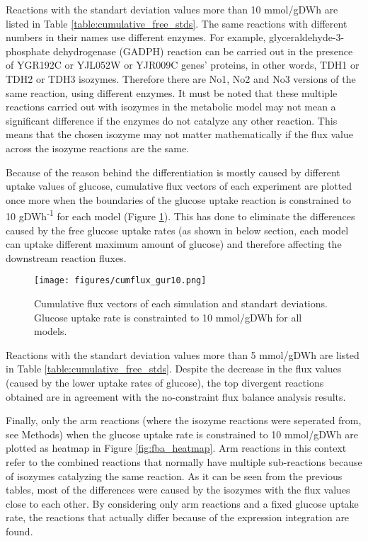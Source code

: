 Reactions with the standart deviation values more than 10 mmol/gDWh are listed in Table \ref{table:cumulative_free_stds}. The same reactions with different numbers in their names use different enzymes. For example, glyceraldehyde-3-phosphate dehydrogenase (GADPH) reaction can be carried out in the presence of YGR192C or YJL052W or YJR009C genes' proteins, in other words, TDH1 or TDH2 or TDH3 isozymes. Therefore there are No1, No2 and No3 versions of the same reaction, using different enzymes. It must be noted that these multiple reactions carried out with isozymes in the metabolic model may not mean a significant difference if the enzymes do not catalyze any other reaction. This means that the chosen isozyme may not matter mathematically if the flux value across the isozyme reactions are the same.


Because of the reason behind the differentiation is mostly caused by different uptake values of glucose, cumulative flux vectors of each experiment are plotted once more when the boundaries of the glucose uptake reaction is constrained to 10 gDWh\textsuperscript{-1} for each model (Figure \ref{fig:cumflux_gur10}). This has done to eliminate the differences caused by the free glucose uptake rates (as shown in below section, each model can uptake different maximum amount of glucose) and therefore affecting the downstream reaction fluxes.

\begin{figure}[H]
  \begin{center}
  \texttt{[image: figures/cumflux\_gur10.png]}
  \caption[Cumulative flux vectors of each experiment when glucose uptake rate is constrained]{Cumulative flux vectors of each simulation and standart deviations. Glucose uptake rate is constrainted to 10 mmol/gDWh for all models. }
  \label{fig:cumflux_gur10}
  \end{center}
\end{figure}

Reactions with the standart deviation values more than 5 mmol/gDWh are listed in Table \ref{table:cumulative_free_stds}. Despite the decrease in the flux values (caused by the lower uptake rates of glucose), the top divergent reactions obtained are in agreement with the no-constraint flux balance analysis results.



Finally, only the arm reactions (where the isozyme reactions were seperated from, see Methods) when the glucose uptake rate is constrained to 10 mmol/gDWh are plotted as heatmap in Figure \ref{fig:fba_heatmap}. Arm reactions in this context refer to the combined reactions that normally have multiple sub-reactions because of isozymes catalyzing the same reaction. As it can be seen from the previous tables, most of the differences were caused by the isozymes with the flux values close to each other. By considering only arm reactions and a fixed glucose uptake rate, the reactions that actually differ because of the expression integration are found.

